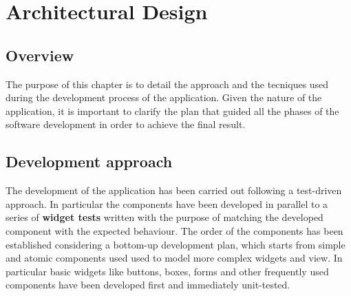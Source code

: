 \documentclass[../../dd.tex]{subfiles}
\begin{document}
\chapter{Architectural Design}
    \section{Overview}
	The purpose of this chapter is to detail the approach and the tecniques used during the development process of the application. Given the nature of the application, it is important to 
	clarify the plan that guided all the phases of the software development in order to achieve the final result.
	
	\section{Development approach}
    The development of the application has been carried out following a test-driven approach. In particular the components have been developed in parallel to a series of
	\textbf{widget tests} written with the purpose of matching the developed component with the expected behaviour. The order of the components has been established considering
	a bottom-up development plan, which starts from simple and atomic components used used to model more complex widgets and view. In particular basic widgets like buttons, boxes, 
	forms and other frequently used components have been developed first and immediately unit-tested. 
   
\end{document}
